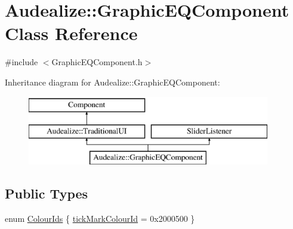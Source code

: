 \hypertarget{class_audealize_1_1_graphic_e_q_component}{}\section{Audealize\+:\+:Graphic\+E\+Q\+Component Class Reference}
\label{class_audealize_1_1_graphic_e_q_component}


{\ttfamily \#include $<$Graphic\+E\+Q\+Component.\+h$>$}

Inheritance diagram for Audealize\+:\+:Graphic\+E\+Q\+Component\+:\begin{figure}[H]
\begin{center}
\leavevmode
\includegraphics[height=3.000000cm]{class_audealize_1_1_graphic_e_q_component}
\end{center}
\end{figure}
\subsection*{Public Types}
\begin{DoxyCompactItemize}
\item 
enum \hyperlink{class_audealize_1_1_graphic_e_q_component_a08b168efce2d6a649d317828325c2560}{Colour\+Ids} \{ \hyperlink{class_audealize_1_1_graphic_e_q_component_a08b168efce2d6a649d317828325c2560a19c6e5f5d03b6ac92e3eb1a9af3f6070}{tick\+Mark\+Colour\+Id} = 0x2000500
 \}
\end{DoxyCompactItemize}
